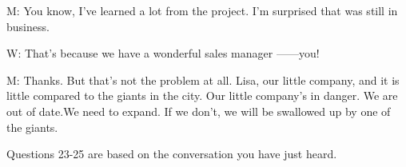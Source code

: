 \documentclass[12pt]{article}
\begin{document}
M: You know, I've learned a lot from the project. I'm surprised that was still in business.
\vspace{0.00mm}

\vspace{0.00mm}
\setlength{\parindent}{0.00mm}
\setlength{\leftskip}{-6.23mm}
\setlength{\rightskip}{0.00mm}


\vspace{0.00mm}

\vspace{0.00mm}
\setlength{\parindent}{0.00mm}
\setlength{\leftskip}{-6.23mm}
\setlength{\rightskip}{0.00mm}

W: That's because we have a wonderful sales manager ------you!
\vspace{0.00mm}

\vspace{0.00mm}
\setlength{\parindent}{0.00mm}
\setlength{\leftskip}{-6.23mm}
\setlength{\rightskip}{0.00mm}


\vspace{0.00mm}

\vspace{0.00mm}
\setlength{\parindent}{0.00mm}
\setlength{\leftskip}{-6.23mm}
\setlength{\rightskip}{0.00mm}

M: Thanks. But that's not the problem at all. Lisa, our little company, and it is little compared to the giants in the city. Our little company's in danger. We are out of date.We need to expand. If we don't, we will be swallowed up by one of the giants.
\vspace{0.00mm}

\vspace{0.00mm}
\setlength{\parindent}{0.00mm}
\setlength{\leftskip}{-6.23mm}
\setlength{\rightskip}{0.00mm}


\vspace{0.00mm}

\vspace{0.00mm}
\setlength{\parindent}{0.00mm}
\setlength{\leftskip}{-6.23mm}
\setlength{\rightskip}{0.00mm}

Questions 23-25 are based on the conversation you have just heard.
\vspace{0.00mm}

\vspace{0.00mm}
\setlength{\parindent}{0.00mm}
\setlength{\leftskip}{-6.23mm}
\setlength{\rightskip}{0.00mm}


\vspace{0.00mm}

\vspace{0.00mm}
\setlength{\parindent}{0.00mm}
\setlength{\leftskip}{-6.23mm}
\setlength{\rightskip}{0.00mm}
\end{document}
